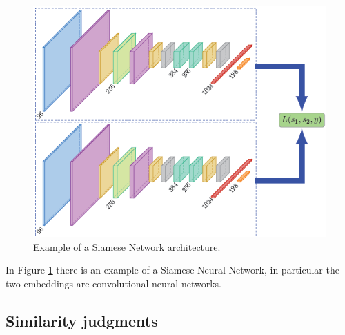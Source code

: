 \documentclass[conference]{IEEEtran}
\begin{document}
					\begin{figure}[!ht]
						\centerline{\includegraphics[width=\linewidth]{imgs/siamese_architecture.png}}
						\caption{Example of a Siamese Network architecture.}
						\label{fig:6}
					\end{figure}
					
					\noindent In Figure \ref{fig:6} there is an example of a Siamese Neural Network, in particular the two embeddings are convolutional neural networks. 
			
			\subsection{Similarity judgments}
				
\end{document}
